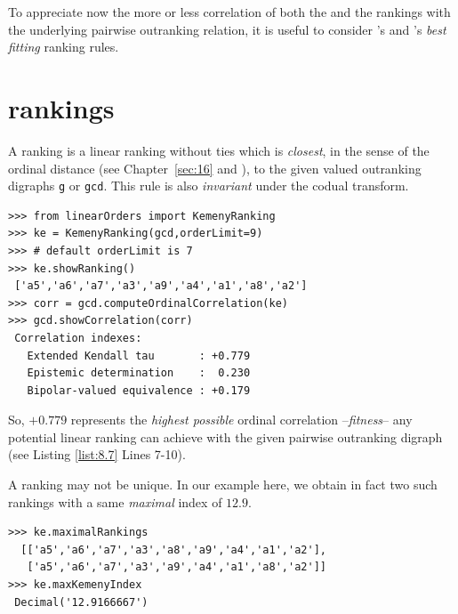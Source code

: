 To appreciate now the more or less correlation of both the \Copeland and the \NetFlows rankings with the underlying pairwise outranking relation, it is useful to consider \Kemeny 's and \Slater 's \emph{best fitting} ranking rules.

\section{\Kemeny rankings}
\label{sec:8.4}

A \Kemeny ranking is a linear ranking without ties which is \emph{closest}, in the sense of the ordinal \Kendall distance (see Chapter~\ref{sec:16} and \citep{BIS-2012a}), to the given valued outranking digraphs \texttt{g} or \texttt{gcd}. This rule is also \emph{invariant} under the codual transform. 
\begin{lstlisting}[caption={Computing a \Kemeny ranking},label=list:8.7]   
>>> from linearOrders import KemenyRanking
>>> ke = KemenyRanking(gcd,orderLimit=9)
>>> # default orderLimit is 7
>>> ke.showRanking()
 ['a5','a6','a7','a3','a9','a4','a1','a8','a2']
>>> corr = gcd.computeOrdinalCorrelation(ke)
>>> gcd.showCorrelation(corr)
 Correlation indexes:
   Extended Kendall tau       : +0.779
   Epistemic determination    :  0.230
   Bipolar-valued equivalence : +0.179
\end{lstlisting}    
So, $+0.779$ represents the \emph{highest possible} ordinal correlation --\emph{fitness}-- any potential linear ranking can achieve with the given pairwise outranking digraph (see Listing \ref{list:8.7} Lines 7-10).

A \Kemeny ranking may not be unique. In our example here, we obtain in fact two such \Kemeny rankings with a same \emph{maximal} \Kemeny index of $12.9$. 
\begin{lstlisting}[caption={Optimal \Kemeny rankings},label=list:8.8] >>> ke.maximalRankings
  [['a5','a6','a7','a3','a8','a9','a4','a1','a2'],
   ['a5','a6','a7','a3','a9','a4','a1','a8','a2']]
>>> ke.maxKemenyIndex
 Decimal('12.9166667')
\end{lstlisting}

